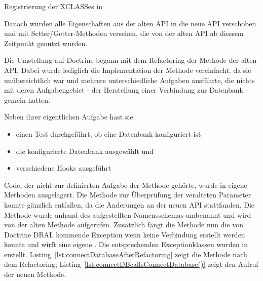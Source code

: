 \begin{listing}[H]
\caption{Registrierung der XCLASSes in }
\label{lst:xclassDatabaseAPI}
\end{listing}

Danach wurden alle Eigenschaften aus der alten API in die neue API verschoben und mit Setter/Getter-Methoden versehen, die von der alten API ab diessem Zeitpunkt genutzt wurden.

Die Umstellung auf Doctrine begann mit dem Refactoring der Methode  der alten API. Dabei wurde lediglich die Implementation der Methode vereinfacht, da sie unübersichtlich war und mehrere unterschiedliche Aufgaben ausführte, die nichts mit deren Aufgabengebiet - der Herstellung einer Verbindung zur Datenbank - gemein hatten.

Neben ihrer eigentlichen Aufgabe hast sie

\begin{itemize}
	\item einen Test durchgeführt, ob eine Datenbank konfiguriert ist
	\item die konfigurierte Datenbank ausgewählt und
	\item verschiedene Hooks ausgeführt
\end{itemize}

Code, der nicht zur definierten Aufgabe der Methode gehörte, wurde in eigene Methoden ausgelagert. Die Methode zur Überprüfung der veralteten Parameter konnte gänzlich entfallen, da die Änderungen an der neuen API stattfanden. Die Methode wurde anhand des aufgestellten Namensschemas umbenannt und wird von der alten Methode aufgerufen. Zusätzlich fängt die Methode nun die von Doctrine DBAL kommende Exception wenn keine Verbindung erstellt werden konnte und wirft eine eigene . Die entsprechenden Exceptionklassen wurden in  erstellt. Listing~\ref{lst:connectDatabaseAfterRefactoring} zeigt die Methode nach dem Refactoring; Listing~\ref{lst:connectDBcallsConnectDatabase()} zeigt den Aufruf der neuen Methode.

